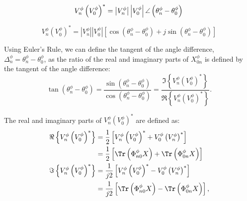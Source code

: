 \begin{equation}
	V_{n}^{\phi} \left( V_{0}^{\phi} \right)^{*} = \left| V_{n}^{\phi} \right| \left| V_{0}^{\phi} \right| \angle \left( \theta_{n}^{\phi} - \theta_{0}^{\phi} \right) \label{VnV0polar} \\
\end{equation}

\begin{equation}
	V_{n}^{\phi} \left( V_{0}^{\phi} \right)^{*} = \left| V_{n}^{\phi} \right| \left| V_{0}^{\phi} \right| \left[ \cos \left( \theta_{n}^{\phi} - \theta_{0}^{\phi} \right) + j \sin \left( \theta_{n}^{\phi} - \theta_{0}^{\phi} \right) \right] \label{VnV0rect} 
\end{equation}

\noindent Using Euler's Rule, we can define the tangent of the angle difference, $ \Delta_{n}^{\phi} = \theta_{n}^{\phi} - \theta_{0}^{\phi}$, as the ratio of the real and imaginary parts of $X_{0n}^{\phi}$ is defined by the tangent of the angle difference:
\begin{equation}
	\tan \left( \theta_{n}^{\phi} - \theta_{0}^{\phi} \right)
    =
    \frac{\sin \left( \theta_{n}^{\phi} - \theta_{0}^{\phi} \right)}{\cos \left( \theta_{n}^{\phi} - \theta_{0}^{\phi} \right)}
    =
    \frac{\Im \left\{ V_{n}^{\phi} \left( V_{0}^{\phi} \right)^{*} \right\}}{\Re \left\{ V_{n}^{\phi} \left( V_{0}^{\phi} \right)^{*} \right\}}.
    \label{eq:tanVkV0}
\end{equation}

\noindent The real and imaginary parts of $V_{n}^{\phi} \left( V_{0}^{\phi} \right)^{*}$ are defined as:
\begin{align}
	\Re \left\{ V_{n}^{\phi} \left( V_{0}^{\phi} \right)^{*} \right\}
    &= 
    \frac{1}{2} \left[ V_{n}^{\phi} \left( V_{0}^{\phi} \right)^{*} + V_{0}^{\phi} \left( V_{n}^{\phi} \right)^{*} \right] \\
    &=
    \frac{1}{2} \left[ \Tr \left( \Phi_{n0}^{\phi} X \right) + \Tr \left( \Phi_{0n}^{\phi} X \right) \right] \label{eq:ReVkV0} \\
    \Im \left\{ V_{n}^{\phi} \left( V_{0}^{\phi} \right)^{*} \right\}
    &=
    \frac{1}{j2} \left[ V_{n}^{\phi} \left( V_{0}^{\phi} \right)^{*} - V_{0}^{\phi} \left( V_{n}^{\phi} \right)^{*} \right] \\
    &=
    \frac{1}{j2} \left[ \Tr \left( \Phi_{n0}^{\phi} X \right) - \Tr \left( \Phi_{0n}^{\phi} X \right) \right], \label{eq:ImVkV0}
\end{align}


